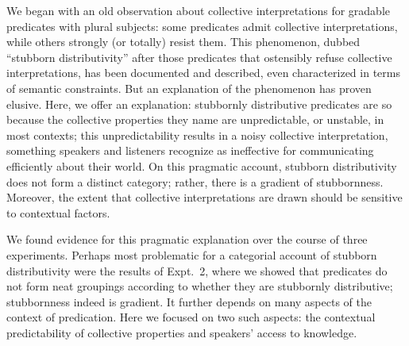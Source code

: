 \documentclass[linguex]{sp}
\newcommand{\ndg}[1]{\textcolor{Green}{[ndg: #1]}}
\begin{document}
We began with an old observation about collective interpretations for gradable predicates with plural subjects: some predicates admit collective interpretations, while others strongly (or totally) resist them. This phenomenon, dubbed ``stubborn distributivity'' after those predicates that ostensibly refuse collective interpretations, has been documented and described, even characterized in terms of semantic constraints. But an explanation of the phenomenon has proven elusive. Here, we offer an explanation: stubbornly distributive predicates are so because the collective properties they name are unpredictable, or unstable, in most contexts; this unpredictability results in a noisy collective interpretation, something speakers and listeners recognize as ineffective for communicating efficiently about their world.
On this pragmatic account, stubborn distributivity does not form a distinct category; rather, there is a gradient of stubbornness. Moreover, the extent that collective interpretations are drawn should be sensitive to contextual factors.



We found evidence for this pragmatic explanation over the course of three experiments. Perhaps most problematic for a categorial account of stubborn distributivity were the results of Expt.~2, where we showed that predicates do not form neat groupings according to whether they are stubbornly distributive; stubbornness indeed is gradient. It further depends on many aspects of the context of predication. Here we focused on two such aspects: the contextual predictability of collective properties and speakers' access to knowledge.
\end{document}
